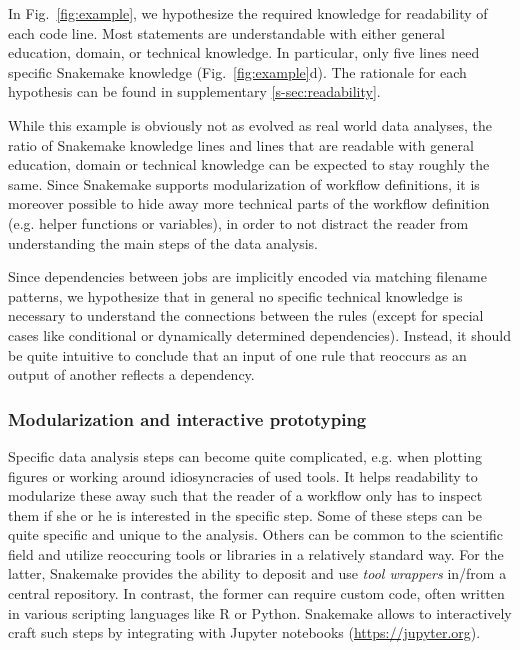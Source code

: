\documentclass[parskip=half]{scrartcl}
\let\plainurl\url
\renewcommand{\url}[1]{\protect\plainurl{#1}}
\begin{document}
In Fig.~{\ref{fig:example}}, we hypothesize the required knowledge for readability of each code line.
Most statements are understandable with either general education, domain, or technical knowledge.
In particular, only five lines need specific Snakemake knowledge (Fig.~{\ref{fig:example}}d).
The rationale for each hypothesis can be found in supplementary \autoref{s-sec:readability}.

While this example is obviously not as evolved as real world data analyses, the ratio of Snakemake knowledge lines and lines that are readable with general education, domain or technical knowledge can be expected to stay roughly the same.
Since Snakemake supports modularization of workflow definitions, it is moreover possible to hide away more technical parts of the workflow definition (e.g. helper functions or variables), in order to not distract the reader from understanding the main steps of the data analysis.

Since dependencies between jobs are implicitly encoded via matching filename patterns, we hypothesize that in general no specific technical knowledge is necessary to understand the connections between the rules (except for special cases like conditional or dynamically determined dependencies).
Instead, it should be quite intuitive to conclude that an input of one rule that reoccurs as an output of another reflects a dependency.

\subsubsection{Modularization and interactive prototyping}\label{sec:modularization}

Specific data analysis steps can become quite complicated, e.g. when plotting figures or working around idiosyncracies of used tools.
It helps readability to modularize these away such that the reader of a workflow only has to inspect them if she or he is interested in the specific step.
Some of these steps can be quite specific and unique to the analysis.
Others can be common to the scientific field and utilize reoccuring tools or libraries in a relatively standard way.
For the latter, Snakemake provides the ability to deposit and use \emph{tool wrappers} in/from a central repository.
In contrast, the former can require custom code, often written in various scripting languages like R or Python.
Snakemake allows to interactively craft such steps by integrating with Jupyter notebooks (\url{https://jupyter.org}).
\end{document}

